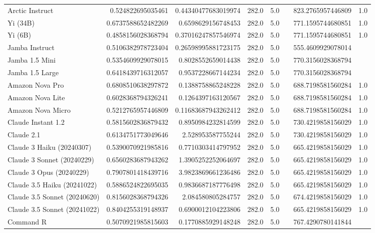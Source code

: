 \begin{table}[htp]
{\begin{tabular}{lrrrrrrr}
Arctic Instruct & 0.524822695035461 & 0.44340477683019974 & 282.0 & 5.0 &  & 823.2765957446809 & 1.0 \\
Yi (34B) & 0.6737588652482269 & 0.6598629156748453 & 282.0 & 5.0 &  & 771.1595744680851 & 1.0 \\
Yi (6B) & 0.4858156028368794 & 0.37016247857546974 & 282.0 & 5.0 &  & 771.1595744680851 & 1.0 \\
Jamba Instruct & 0.5106382978723404 & 0.26598995881723175 & 282.0 & 5.0 &  & 555.4609929078014 &  \\
Jamba 1.5 Mini & 0.5354609929078015 & 0.8028552659014438 & 282.0 & 5.0 &  & 770.3156028368794 &  \\
Jamba 1.5 Large & 0.6418439716312057 & 0.9537228667144234 & 282.0 & 5.0 &  & 770.3156028368794 &  \\
Amazon Nova Pro & 0.6808510638297872 & 0.1388758865248228 & 282.0 & 5.0 &  & 688.7198581560284 & 1.0 \\
Amazon Nova Lite & 0.6028368794326241 & 0.1264397163120567 & 282.0 & 5.0 &  & 688.7198581560284 & 1.0 \\
Amazon Nova Micro & 0.5212765957446809 & 0.11683687943262412 & 282.0 & 5.0 &  & 688.7198581560284 & 1.0 \\
Claude Instant 1.2 & 0.5815602836879432 & 0.8950984232814599 & 282.0 & 5.0 &  & 730.4219858156029 & 1.0 \\
Claude 2.1 & 0.6134751773049646 & 2.528953587755244 & 282.0 & 5.0 &  & 730.4219858156029 & 1.0 \\
Claude 3 Haiku (20240307) & 0.5390070921985816 & 0.7710303414797952 & 282.0 & 5.0 &  & 665.4219858156029 & 1.0 \\
Claude 3 Sonnet (20240229) & 0.6560283687943262 & 1.3905252252064697 & 282.0 & 5.0 &  & 665.4219858156029 & 1.0 \\
Claude 3 Opus (20240229) & 0.7907801418439716 & 3.9823869661236486 & 282.0 & 5.0 &  & 665.4219858156029 & 1.0 \\
Claude 3.5 Haiku (20241022) & 0.5886524822695035 & 0.9836687187776498 & 282.0 & 5.0 &  & 665.4219858156029 & 1.0 \\
Claude 3.5 Sonnet (20240620) & 0.8156028368794326 & 2.084580805284757 & 282.0 & 5.0 &  & 674.4219858156029 & 1.0 \\
Claude 3.5 Sonnet (20241022) & 0.8404255319148937 & 0.6900012104223806 & 282.0 & 5.0 &  & 665.4219858156029 & 1.0 \\
Command R & 0.5070921985815603 & 0.1770885929148248 & 282.0 & 5.0 &  & 767.4290780141844 &  \\

\end{tabular}}
\end{table}
